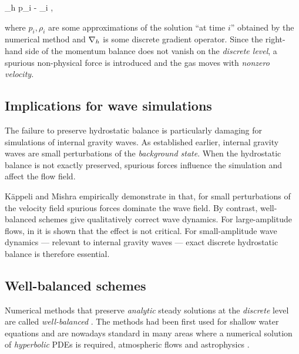 \documentclass[../main.tex]{subfiles}
\begin{document}
\begin{equations}[single,*]
	\grad_h p_{i} - \rho_i  ,
\end{equations}

where $p_i, \rho_i$ are some approximations of the solution \enquote{at time $i$} obtained by the numerical method and $\nabla_{h}$ is some discrete gradient operator. Since the right-hand side of the momentum balance  does not vanish on the \emph{discrete level}, a spurious non-physical force is introduced and the gas moves with \emph{nonzero velocity.}

\subsection{Implications for wave simulations}
\label{sec:WB-WAVES}

The failure to preserve hydrostatic balance is particularly damaging for simulations of internal gravity waves. As established earlier, internal gravity waves are small perturbations of the \emph{background state}. When the hydrostatic balance is not exactly preserved, spurious forces influence the simulation and affect the flow field.

Käppeli and Mishra empirically demonstrate in \autocite[p.~6]{kappeliWellbalancedFiniteVolume2016a} that, for small perturbations of the velocity field
spurious forces dominate the wave field. By contrast, well-balanced schemes give qualitatively correct wave dynamics. For large-amplitude flows, in \autocite[p.~6]{kappeliWellbalancedFiniteVolume2016a} it is shown that the effect is not critical. 
For small-amplitude wave dynamics --- relevant to internal gravity waves --- exact discrete hydrostatic balance is therefore essential.

\subsection{Well-balanced schemes}
\label{sec:WB-SCHEMES}

Numerical methods that preserve \emph{analytic} steady solutions at the \emph{discrete} level are called \emph{well-balanced} \autocite{cargoSchemaEquilibreAdapte1994,greenbergWellBalancedSchemeNumerical1996}. The methods had been first used for shallow water equations \autocite{greenbergWellBalancedSchemeNumerical1996} and are nowadays standard in many areas where a numerical solution of \emph{hyperbolic} PDEs is required, \eg atmospheric flows \autocite{kappeliWellbalancedFiniteVolume2016a,chertockWellbalancedNumericalMethod2023,berthonFullyWellbalancedEntropystable2025} and astrophysics \autocite{kappeliWellbalancedMethodsComputational2022}. 
\end{document}
